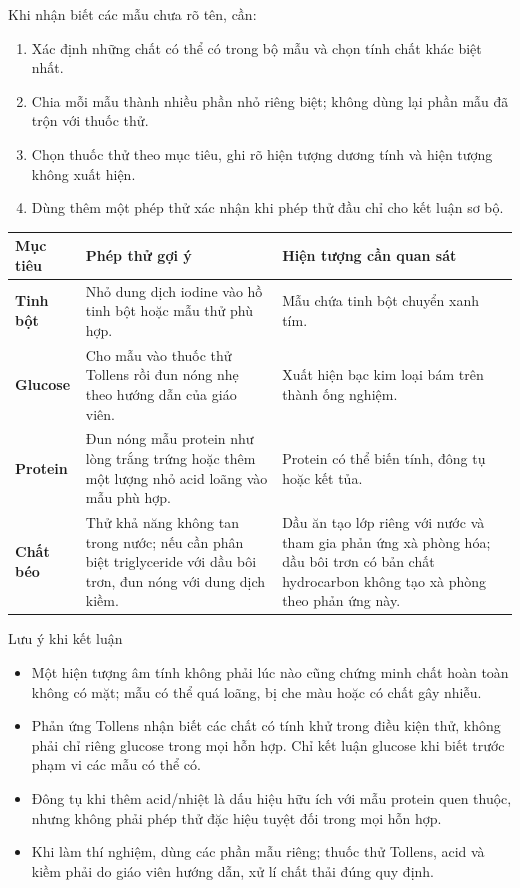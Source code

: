 Khi nhận biết các mẫu chưa rõ tên, cần:
\begin{enumerate}
\item Xác định những chất có thể có trong bộ mẫu và chọn tính chất khác biệt nhất.
\item Chia mỗi mẫu thành nhiều phần nhỏ riêng biệt; không dùng lại phần mẫu đã trộn với thuốc thử.
\item Chọn thuốc thử theo mục tiêu, ghi rõ hiện tượng dương tính và hiện tượng không xuất hiện.
\item Dùng thêm một phép thử xác nhận khi phép thử đầu chỉ cho kết luận sơ bộ.
\end{enumerate}

\begin{center}
\begin{tabularx}{0.98\textwidth}{>{\bfseries}p{2.35cm}YY}
\toprule
Mục tiêu & Phép thử gợi ý & Hiện tượng cần quan sát \\
\midrule
Tinh bột &
Nhỏ dung dịch iodine vào hồ tinh bột hoặc mẫu thử phù hợp. &
Mẫu chứa tinh bột chuyển xanh tím. \\
Glucose &
Cho mẫu vào thuốc thử Tollens rồi đun nóng nhẹ theo hướng dẫn của giáo viên. &
Xuất hiện bạc kim loại bám trên thành ống nghiệm. \\
Protein &
Đun nóng mẫu protein như lòng trắng trứng hoặc thêm một lượng nhỏ acid loãng vào mẫu phù hợp. &
Protein có thể biến tính, đông tụ hoặc kết tủa. \\
Chất béo &
Thử khả năng không tan trong nước; nếu cần phân biệt triglyceride với dầu bôi trơn, đun nóng với dung dịch kiềm. &
Dầu ăn tạo lớp riêng với nước và tham gia phản ứng xà phòng hóa; dầu bôi trơn có bản chất hydrocarbon không tạo xà phòng theo phản ứng này. \\
\bottomrule
\end{tabularx}
\end{center}

\begin{ghinho}{Lưu ý khi kết luận}
\begin{itemize}
\item Một hiện tượng âm tính không phải lúc nào cũng chứng minh chất hoàn toàn không có mặt; mẫu có thể quá loãng, bị che màu hoặc có chất gây nhiễu.
\item Phản ứng Tollens nhận biết các chất có tính khử trong điều kiện thử, không phải chỉ riêng glucose trong mọi hỗn hợp. Chỉ kết luận glucose khi biết trước phạm vi các mẫu có thể có.
\item Đông tụ khi thêm acid/nhiệt là dấu hiệu hữu ích với mẫu protein quen thuộc, nhưng không phải phép thử đặc hiệu tuyệt đối trong mọi hỗn hợp.
\item Khi làm thí nghiệm, dùng các phần mẫu riêng; thuốc thử Tollens, acid và kiềm phải do giáo viên hướng dẫn, xử lí chất thải đúng quy định.
\end{itemize}
\end{ghinho}

